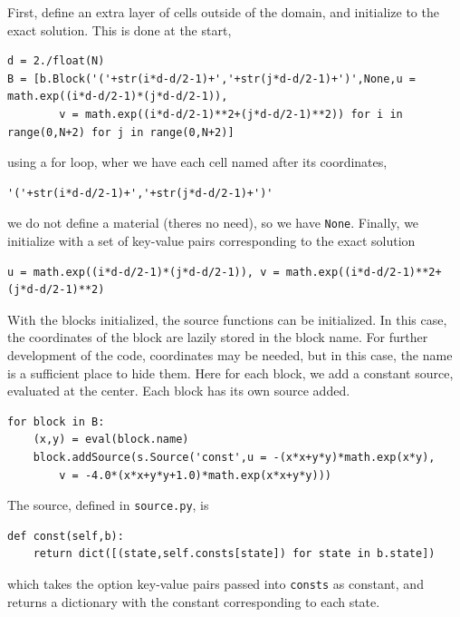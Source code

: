 \documentclass[11pt]{article}
\begin{document}
First, define an extra layer of cells outside of the domain, and initialize to the exact solution. This is done at the start,

\begin{lstlisting}
d = 2./float(N)
B = [b.Block('('+str(i*d-d/2-1)+','+str(j*d-d/2-1)+')',None,u = math.exp((i*d-d/2-1)*(j*d-d/2-1)),
		v = math.exp((i*d-d/2-1)**2+(j*d-d/2-1)**2)) for i in range(0,N+2) for j in range(0,N+2)]
\end{lstlisting}
using a for loop, wher we have each cell named after its coordinates,
\begin{lstlisting}
'('+str(i*d-d/2-1)+','+str(j*d-d/2-1)+')'
\end{lstlisting}we do not define a material (theres no need), so we have \lstinline{None}. Finally, we initialize with a set of key-value pairs corresponding to the exact solution
\begin{lstlisting}
u = math.exp((i*d-d/2-1)*(j*d-d/2-1)), v = math.exp((i*d-d/2-1)**2+(j*d-d/2-1)**2)
\end{lstlisting}
With the blocks initialized, the source functions can be initialized. In this case, the coordinates of the block are lazily stored in the block name. For further development of the code, coordinates may be needed, but in this case, the name is a sufficient place to hide them. Here for each block, we add a constant source, evaluated at the center. Each block has its own source added.
\begin{lstlisting}
for block in B:
	(x,y) = eval(block.name)
	block.addSource(s.Source('const',u = -(x*x+y*y)*math.exp(x*y),
		v = -4.0*(x*x+y*y+1.0)*math.exp(x*x+y*y)))
\end{lstlisting}
The source, defined in \lstinline{source.py}, is 
\begin{lstlisting}
def const(self,b):
	return dict([(state,self.consts[state]) for state in b.state])
\end{lstlisting}
which takes the option key-value pairs passed into \lstinline{consts} as constant, and returns a dictionary with the constant corresponding to each state.
\end{document}
